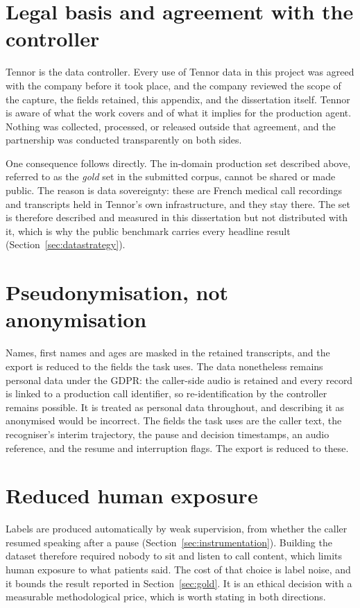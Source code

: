 \section{Legal basis and agreement with the controller}

Tennor is the data controller. Every use of Tennor data in this project was agreed with the
company before it took place, and the company reviewed the scope of the capture, the fields
retained, this appendix, and the dissertation itself. Tennor is aware of what the work covers
and of what it implies for the production agent. Nothing was collected, processed, or released
outside that agreement, and the partnership was conducted transparently on both sides.

One consequence follows directly. The in-domain production set described above, referred to as
the \emph{gold} set in the submitted corpus, cannot be shared or made public. The reason is data
sovereignty: these are French medical call recordings and transcripts held in Tennor's own
infrastructure, and they stay there. The set is therefore described and measured in this
dissertation but not distributed with it, which is why the public benchmark carries every
headline result (Section~\ref{sec:datastrategy}).

\section{Pseudonymisation, not anonymisation}

Names, first names and ages are masked in the retained transcripts, and the export is
reduced to the fields the task uses. The data nonetheless remains personal data under the GDPR: the caller-side audio is
retained and every record is linked to a production call identifier, so re-identification by
the controller remains possible. It is treated as personal data throughout, and describing
it as anonymised would be incorrect. The fields the task uses are the caller text, the recogniser's interim trajectory, the pause
and decision timestamps, an audio reference, and the resume and interruption flags. The
export is reduced to these.

\section{Reduced human exposure}

Labels are produced automatically by weak supervision, from whether the caller resumed
speaking after a pause (Section~\ref{sec:instrumentation}). Building the dataset therefore
required nobody to sit and listen to call content, which limits human exposure to what
patients said. The cost of that choice is label noise, and it bounds the result reported in
Section~\ref{sec:gold}. It is an ethical decision with a measurable methodological price,
which is worth stating in both directions.

